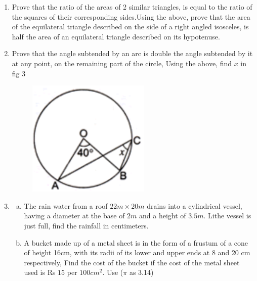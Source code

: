 \documentclass[journal,12pt,twocolumn]{IEEEtran}
\begin{document}
\begin{enumerate}[label=1.\arabic*]
\begin{enumerate}[label=2.\arabic*]
\begin{enumerate}[label=3.\arabic*]
\item Prove that the ratio of the areas of 2 similar triangles, is equal to the ratio
of the squares of their corresponding sides.Using the above, prove that the area of the
equilateral triangle described on the side of a right angled isosceles, is half the area
of an equilateral triangle described on its hypotenuse.\\
\item Prove that the angle subtended by an arc is double the angle subtended by it at any 
point, on the remaining part of the circle, Using the above, find $x$ in fig 3
\begin{figure}
\centering
\includegraphics[width=0.5\columnwidth,center]{fig 1.3}\\
\caption{}
\label{Fig 3}
\end{figure}
\vspace{2mm}
\item \begin{enumerate}[a)]
\item The rain water from a roof $22m \times 20m$ drains into a cylindrical vessel, having a diameter at the base of $2m$ and a height of $3.5m$. Lithe vessel is just full, find the rainfall in centimeters.\\
\item A bucket made up of a metal sheet is in the form of a frustum of a cone of height 16cm, with its radii of its lower and upper ends at 8 and 20 cm respectively, Find the cost of the bucket if the cost of the metal sheet used is Rs $15$ per $100 cm^2$. Use ($\pi$ as 3.14)\\
\end{enumerate}


\end{enumerate}
\end{enumerate}
\end{enumerate}
\end{document}
